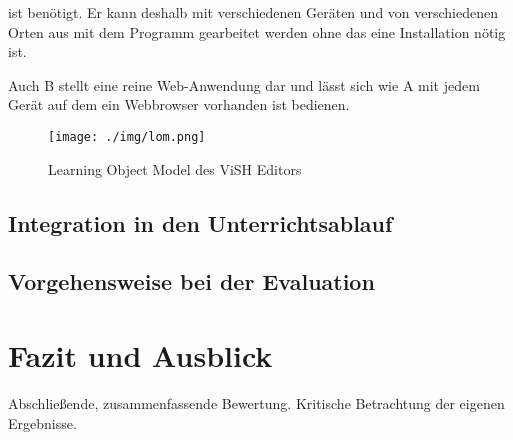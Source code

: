 \documentclass[conference]{IEEEtran}
\begin{document}
ist benötigt. Er kann deshalb mit verschiedenen Geräten und von verschiedenen Orten aus mit dem Programm gearbeitet werden ohne das eine Installation nötig ist.

Auch B stellt eine reine Web-Anwendung dar und lässt sich wie A mit jedem Gerät auf dem ein Webbrowser vorhanden ist bedienen.

\begin{figure}[htbp]
\centerline{\texttt{[image: ./img/lom.png]}}
\caption{Learning Object Model des ViSH Editors \cite[p. 3]{Gordillo2015}}
\label{lom}
\end{figure}

\subsection{Integration in den Unterrichtsablauf}
\subsection{Vorgehensweise bei der Evaluation}


\section{Fazit und Ausblick}
Abschließende, zusammenfassende Bewertung. Kritische Betrachtung der eigenen Ergebnisse.





\end{document}
